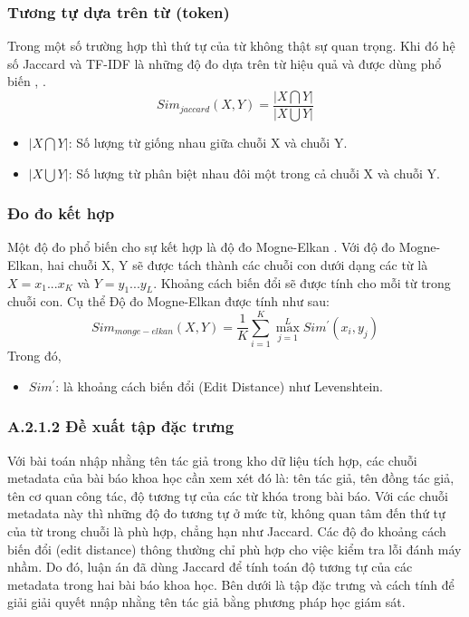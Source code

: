 \subsubsection*{Tương tự dựa trên từ (token)} 
Trong một số trường hợp thì thứ tự của từ không thật sự quan trọng. Khi đó hệ số Jaccard và TF-IDF là những độ đo dựa trên từ hiệu quả và được dùng phổ biến \cite{Baeza-Yates:1999:MIR}, \cite{CohenRF03}.
\begin{equation}
Sim_{jaccard}(X,Y) = \displaystyle\frac{|X \bigcap Y|}{|X \bigcup Y|}
\end{equation}
\begin{itemize}
\item $|X \bigcap Y|$: Số lượng từ giống nhau giữa chuỗi X và chuỗi Y.
\item $|X \bigcup Y|$: Số lượng từ phân biệt nhau đôi một trong cả chuỗi X và chuỗi Y.
\end{itemize}

\subsubsection*{Đo đo kết hợp} 
Một độ đo phổ biến cho sự kết hợp là độ đo Mogne-Elkan \cite{CohenRF03}. Với độ đo Mogne-Elkan, hai chuỗi X, Y sẽ được tách thành các chuỗi con dưới dạng các từ là  $X = x_{1}...x_{K}$ và $Y = y_{1}...y_{L}$. Khoảng cách biến đổi sẽ được tính cho mỗi từ trong chuỗi con. Cụ thể Độ đo Mogne-Elkan được tính như sau:
\begin{equation}
Sim_{monge-elkan}(X,Y) = \displaystyle\frac{1}{K}\sum_{i=1}^K \max_{j=1}^{L} Sim^{'} (x_{i},y_{j})
\end{equation}
Trong đó,
\begin{itemize}
\item $Sim^{'}$: là khoảng cách biến đổi (Edit Distance) như Levenshtein.
\end{itemize}

\subsubsection*{A.2.1.2 Đề xuất tập đặc trưng} \label{section:ProposedFeatureSet}
Với bài toán nhập nhằng tên tác giả trong kho dữ liệu tích hợp, các chuỗi metadata của bài báo khoa học cần xem xét đó là: tên tác giả, tên đồng tác giả, tên cơ quan công tác, độ tương tự của các từ khóa trong bài báo. Với các chuỗi metadata này thì những độ đo tương tự ở mức từ, không quan tâm đến thứ tự của từ trong chuỗi là phù hợp, chẳng hạn như Jaccard. Các độ đo khoảng cách biến đổi (edit distance) thông thường chỉ phù hợp cho việc kiểm tra lỗi đánh máy nhầm. Do đó, luận án đã dùng Jaccard để tính toán độ tương tự của các metadata trong hai bài báo khoa học. Bên dưới là tập đặc trưng và cách tính để giải giải quyết nnập nhằng tên tác giả bằng phương pháp học giám sát.

